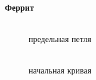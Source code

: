 \documentclass[a4paper, 12pt]{article}
\begin{document}
\newpage

\begin{center}
	\textbf{Феррит}
\end{center}

\begin{figure}[h]
	\begin{minipage}[h]{0.5\linewidth}
		\\ предельная петля
	\end{minipage}
	\begin{minipage}[h]{0.5\linewidth}
		\\ начальная кривая
	\end{minipage}
\end{figure}
\end{document}
